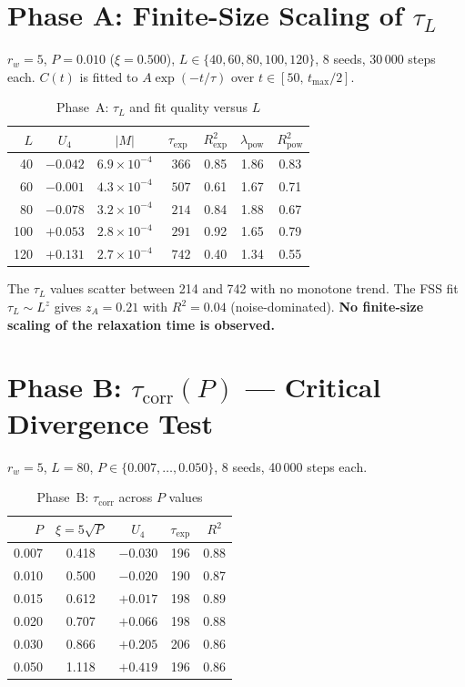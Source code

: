 \documentclass[11pt,a4paper]{article}
\begin{document}
\section{Phase A: Finite-Size Scaling of $\tau_L$}

$r_w{=}5$, $P{=}0.010$ ($\xi{=}0.500$), $L\in\{40,60,80,100,120\}$,
8 seeds, 30\,000 steps each.
$C(t)$ is fitted to $A\exp(-t/\tau)$ over $t\in[50,\,t_\mathrm{max}/2]$.

\begin{table}[h]
\centering
\caption{Phase~A: $\tau_L$ and fit quality versus $L$}
\label{tab:phaseA}
\begin{tabular}{rcccccc}
\toprule
$L$ & $U_4$ & $|M|$ & $\tau_\mathrm{exp}$ & $R^2_\mathrm{exp}$
    & $\lambda_\mathrm{pow}$ & $R^2_\mathrm{pow}$ \\
\midrule
 40 & $-0.042$ & $6.9\times10^{-4}$ & $\phantom{0}366$ & 0.85 & 1.86 & 0.83 \\
 60 & $-0.001$ & $4.3\times10^{-4}$ & $\phantom{0}507$ & 0.61 & 1.67 & 0.71 \\
 80 & $-0.078$ & $3.2\times10^{-4}$ & $\phantom{0}214$ & 0.84 & 1.88 & 0.67 \\
100 & $+0.053$ & $2.8\times10^{-4}$ & $\phantom{0}291$ & 0.92 & 1.65 & 0.79 \\
120 & $+0.131$ & $2.7\times10^{-4}$ & $\phantom{0}742$ & 0.40 & 1.34 & 0.55 \\
\bottomrule
\end{tabular}
\end{table}

The $\tau_L$ values scatter between 214 and 742 with no monotone trend.
The FSS fit $\tau_L\sim L^z$ gives $z_A=0.21$ with $R^2=0.04$ (noise-dominated).
\textbf{No finite-size scaling of the relaxation time is observed.}

\section{Phase B: $\tau_\mathrm{corr}(P)$ --- Critical Divergence Test}

$r_w{=}5$, $L{=}80$, $P\in\{0.007,\ldots,0.050\}$, 8 seeds, 40\,000 steps each.

\begin{table}[h]
\centering
\caption{Phase~B: $\tau_\mathrm{corr}$ across $P$ values}
\label{tab:phaseB}
\begin{tabular}{rcccc}
\toprule
$P$ & $\xi=5\sqrt{P}$ & $U_4$ & $\tau_\mathrm{exp}$ & $R^2$ \\
\midrule
0.007 & 0.418 & $-0.030$ & 196 & 0.88 \\
0.010 & 0.500 & $-0.020$ & 190 & 0.87 \\
0.015 & 0.612 & $+0.017$ & 198 & 0.89 \\
0.020 & 0.707 & $+0.066$ & 198 & 0.88 \\
0.030 & 0.866 & $+0.205$ & 206 & 0.86 \\
0.050 & 1.118 & $+0.419$ & 196 & 0.86 \\
\bottomrule
\end{tabular}
\end{table}
\end{document}
